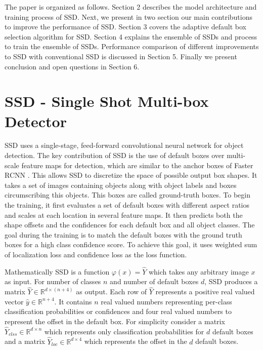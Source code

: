 \documentclass[conference]{IEEEtran}
\begin{document}
\IEEEpubidadjcol

The paper is organized as follows. Section 2 describes the model architecture and training process of SSD. Next, we present in two section our main contributions to improve the performance of SSD. Section 3 covers the adaptive default box selection algorithm for SSD. Section 4 explains the ensemble of SSDs and process to train the ensemble of SSDs. Performance comparison of different improvements to SSD with conventional SSD is discussed in Section 5. Finally we present conclusion and open questions in Section 6.

\section{SSD - Single Shot Multi-box Detector}
SSD uses a single-stage, feed-forward convolutional neural network  for object detection. The key contribution of SSD is the use of default boxes over multi-scale feature maps for detection, which are similar to the anchor boxes of Faster RCNN \cite{DBLP:journals/corr/RenHG015}. This allows SSD to discretize the space of possible output box shapes. It takes a set of images containing objects along with object labels and boxes circumscribing this objects. This boxes are called ground-truth boxes. %
To begin the training, it first evaluates a set of default boxes with different aspect ratios and scales at each location in several feature maps. It then predicts both the shape offsets and the confidences for each default box and all object classes. The goal during the training is to match the default boxes with the ground truth boxes for a high class confidence score. To achieve this goal, it uses weighted sum of localization loss and confidence loss as the loss function. 

Mathematically SSD is a function $\varphi(x) = \hat{Y}$ which takes any arbitrary image $x$ as input. For number of classes $n$ and number of default boxes $d$, SSD produces a matrix $\hat{Y} \in \mathbb{R}^{d \times (n + 4)}$ as output. Each row of $\hat{Y}$ represents a positive real valued vector $\hat{y} \in \mathbb{R}^{n+4}$. It contains $n$ real valued numbers representing per-class classification probabilities or confidences and four real valued numbers to represent the offset in the default box. For simplicity consider a matrix $\hat{Y}_{clss} \in \mathbb{R}^{d \times n}$ which represents only classification probabilities for $d$ default boxes and a matrix $\hat{Y}_{loc} \in \mathbb{R}^{d \times 4}$ which represents the offset in the $d$ default boxes. 
\end{document}

